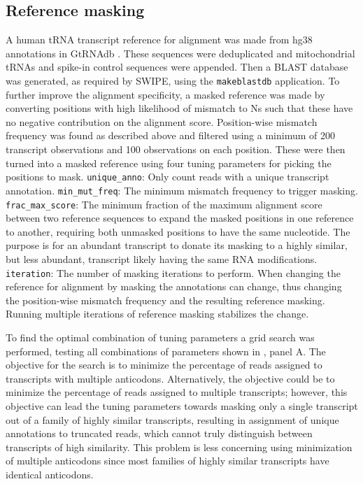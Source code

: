 \documentclass[9pt,lineno]{elife}
\begin{document}
\subsection{Reference masking}
A human tRNA transcript reference for alignment was made from hg38 annotations in GtRNAdb \citep{Chan2016-wt}.
These sequences were deduplicated and mitochondrial tRNAs and spike-in control sequences were appended.
Then a BLAST database was generated, as required by SWIPE, using the \texttt{makeblastdb} application.
To further improve the alignment specificity, a masked reference was made by converting positions with high likelihood of mismatch to Ns such that these have no negative contribution on the alignment score.
Position-wise mismatch frequency was found as described above and filtered using a minimum of 200 transcript observations and 100 observations on each position.
These were then turned into a masked reference using four tuning parameters for picking the positions to mask.
\verb|unique_anno|: Only count reads with a unique transcript annotation.
\verb|min_mut_freq|: The minimum mismatch frequency to trigger masking.
\verb|frac_max_score|: The minimum fraction of the maximum alignment score between two reference sequences to expand the masked positions in one reference to another, requiring both unmasked positions to have the same nucleotide.
The purpose is for an abundant transcript to donate its masking to a highly similar, but less abundant, transcript likely having the same RNA modifications.
\verb|iteration|: The number of masking iterations to perform.
When changing the reference for alignment by masking the annotations can change, thus changing the position-wise mismatch frequency and the resulting reference masking.
Running multiple iterations of reference masking stabilizes the change.

To find the optimal combination of tuning parameters a grid search was performed, testing all combinations of parameters shown in , panel A.
The objective for the search is to minimize the percentage of reads assigned to transcripts with multiple anticodons.
Alternatively, the objective could be to minimize the percentage of reads assigned to multiple transcripts; however, this objective can lead the tuning parameters towards masking only a single transcript out of a family of highly similar transcripts, resulting in assignment of unique annotations to truncated reads, which cannot truly distinguish between transcripts of high similarity.
This problem is less concerning using minimization of multiple anticodons since most families of highly similar transcripts have identical anticodons.
\end{document}
